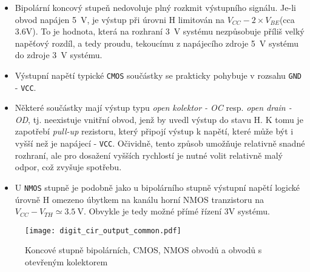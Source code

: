     \begin{itemize}
      \item Bipolární koncový stupeň nedovoluje plný rozkmit výstupního signálu. Je-li obvod
            napájen \qty{5}{\volt}, je výstup při úrovni H limitován na $V_{CC}-2\times V_{BE}$(cca
            3.6V). To je hodnota, která na rozhraní \qty{3}{\volt} systému nezpůsobuje příliš velký
            napěťový rozdíl, a tedy proudu, tekoucímu z napájecího zdroje \qty{5}{\volt} systému do
            zdroje \qty{3}{\volt} systému.
      \item Výstupní napětí typické \texttt{CMOS} součástky se prakticky pohybuje v rozsahu
            \texttt{GND} - \texttt{VCC}.
      \item Některé součástky mají výstup typu \emph{open kolektor - OC} resp. \emph{open drain -
            OD}, tj. neexistuje vnitřní obvod, jenž by uvedl výstup do stavu H. K tomu je zapotřebí
            \emph{pull-up} rezistoru, který připojí výstup k napětí, které může být i vyšší než je
            napájecí - \texttt{VCC}. Očividně, tento způsob umožňuje relativně snadné rozhraní, ale
            pro dosažení vyšších rychlostí je nutné volit relativně malý odpor, což zvyšuje
            spotřebu.
      \item U \texttt{NMOS} stupně je podobně jako u bipolárního stupně výstupní napětí logické
            úrovně H omezeno úbytkem na kanálu horní NMOS tranzistoru na $V_{CC} - V_{TH}\simeq
            \qty{3.5}{\volt}$. Obvykle je tedy možné přímé řízení 3V systému.
    \end{itemize}

    \begin{figure}[ht!]
         \centering
         \texttt{[image: digit\_cir\_output\_common.pdf]}
         \caption[Koncové stupně digitálních obvodů]
                 {Koncové stupně bipolárních, CMOS, NMOS obvodů a obvodů s otevřeným kolektorem 
                  \cite[p.~2]{AN240}}
         \label{ces:fig_digit_out_common}
    \end{figure}   
    
